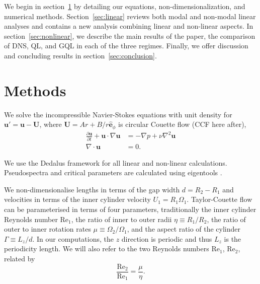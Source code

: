 \documentclass[openacc]{rstransa}%
\newcommand{\Reyn}{\mathrm{Re}}
\begin{document}
We begin in section~\ref{sec:methods} by detailing our equations, non-dimensionalization, and numerical methods. Section~\ref{sec:linear} reviews both modal and non-modal linear analyses and contains a new analysis combining linear and non-linear aspects. In section~\ref{sec:nonlinear}, we describe the main results of the paper, the comparison of DNS, QL, and GQL in each of the three regimes. Finally, we offer discussion and concluding results in section~\ref{sec:conclusion}.

\section{Methods}
\label{sec:methods}
We solve the incompressible Navier-Stokes equations with unit density for $\mathbf{u}' = \mathbf{u} - \mathbf{U}$,
where $\mathbf{U} = A r + B/r \hat{\mathbf{e}}_\phi$ is circular Couette flow (CCF here after),
\begin{align}
      \frac{\partial \mathbf{u}}{\partial t} + \mathbf{u} \cdot \nabla \mathbf{u} &= -\nabla p + \nu \nabla^2\mathbf{u}\\
      \nabla \cdot \mathbf{u} &= 0.
\end{align}

We use the Dedalus framework \cite{2020PhRvR...2b3068B} for all linear and non-linear calculations. Pseudospectra and critical parameters are calculated using eigentools \cite{2021JOSS....6.3079O}. 

We non-dimensionalise lengths in terms of the gap width $d = R_2 - R_1$ and velocities in terms of the inner cylinder velocity $U_1 = R_1 \Omega_1$. Taylor-Couette flow can be parameterised in terms of four parameters, traditionally the inner cylinder Reynolds number $\Reyn_1$, the ratio of inner to outer radii $\eta \equiv R_1/R_2$, the ratio of outer to inner rotation rates $\mu \equiv \Omega_2/\Omega_1$, and the aspect ratio of the cylinder $\Gamma \equiv L_z/d$. In our computations, the $z$ direction is periodic and thus $L_z$ is the periodicity length. We will also refer to the two Reynolds numbers $\Reyn_1$, $\Reyn_2$, related by
\begin{equation}
    \frac{\Reyn_2}{\Reyn_1} = \frac{\mu}{\eta}.
\end{equation}
\end{document}
